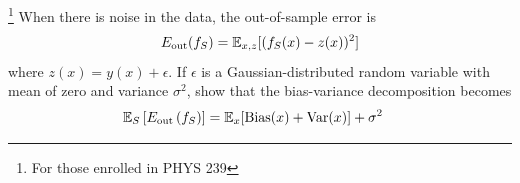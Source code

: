 \begin{solution}

\end{solution}

\begin{problem}[5]\footnote{For those enrolled in PHYS 239} When there is noise in the data, the out-of-sample error is
\begin{align}
	E_\text{out}(f_S)  = \mathbb{E}_{x,z}[(f_S(x) - z(x))^2]
\end{align}
where $z(x) = y(x) + \epsilon$.
If $\epsilon$ is a Gaussian-distributed random variable with mean of zero and variance $\sigma^2$, show that the bias-variance decomposition becomes
\begin{align}
	\mathbb{E}_S \left[E_\text{out}\left(f_S\right)\right] & = \mathbb{E}_x[\operatorname{Bias}(x) + \operatorname{Var}(x)] + \sigma^2
\end{align}
\end{problem}
\begin{solution}

\end{solution}


